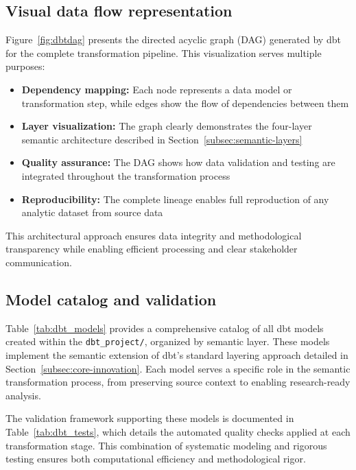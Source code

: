 \documentclass{article}
\begin{document}
\subsection{Visual data flow representation}

Figure~\ref{fig:dbtdag} presents the directed acyclic graph (DAG) generated by dbt for the complete transformation pipeline. This visualization serves multiple purposes:

\begin{itemize}
    \item \textbf{Dependency mapping:} Each node represents a data model or transformation step, while edges show the flow of dependencies between them
    \item \textbf{Layer visualization:} The graph clearly demonstrates the four-layer semantic architecture described in Section~\ref{subsec:semantic-layers}
    \item \textbf{Quality assurance:} The DAG shows how data validation and testing are integrated throughout the transformation process
    \item \textbf{Reproducibility:} The complete lineage enables full reproduction of any analytic dataset from source data
\end{itemize}

This architectural approach ensures data integrity and methodological transparency while enabling efficient processing and clear stakeholder communication.

\subsection{Model catalog and validation}

Table~\ref{tab:dbt_models} provides a comprehensive catalog of all dbt models created within the \texttt{dbt\_project/}, organized by semantic layer. These models implement the semantic extension of dbt's standard layering approach detailed in Section~\ref{subsec:core-innovation}. Each model serves a specific role in the semantic transformation process, from preserving source context to enabling research-ready analysis.

The validation framework supporting these models is documented in Table~\ref{tab:dbt_tests}, which details the automated quality checks applied at each transformation stage. This combination of systematic modeling and rigorous testing ensures both computational efficiency and methodological rigor.


\end{document}
